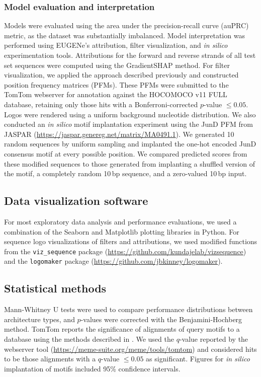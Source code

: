 \subsubsection{Model evaluation and interpretation}

Models were evaluated using the area under the precision-recall curve (auPRC) metric, as the dataset was substantially imbalanced. Model interpretation was performed using EUGENe’s attribution, filter visualization, and \textit{in silico} experimentation tools. Attributions for the forward and reverse strands of all test set sequences were computed using the GradientSHAP method.\cite{Lundberg2017-hh} For filter visualization, we applied the approach described previously and constructed position frequency matrices (PFMs). These PFMs were submitted to the TomTom webserver for annotation against the HOCOMOCO v11 FULL database,\cite{Kulakovskiy2018-oz} retaining only those hits with a Bonferroni-corrected $p$-value $\leq 0.05$. Logos were rendered using a uniform background nucleotide distribution. We also conducted an \textit{in silico} motif implantation experiment using the JunD PFM from JASPAR (\url{https://jaspar.genereg.net/matrix/MA0491.1}). We generated 10 random sequences by uniform sampling and implanted the one-hot encoded JunD consensus motif at every possible position. We compared predicted scores from these modified sequences to those generated from implanting a shuffled version of the motif, a completely random 10\,bp sequence, and a zero-valued 10\,bp input.

\subsection{Data visualization software}

For most exploratory data analysis and performance evaluations, we used a combination of the Seaborn and Matplotlib plotting libraries in Python. For sequence logo visualizations of filters and attributions, we used modified functions from the \texttt{viz\_sequence} package (\url{https://github.com/kundajelab/vizsequence}) and the \texttt{logomaker} package (\url{https://github.com/jbkinney/logomaker}).

\subsection{Statistical methods}

Mann-Whitney U tests\cite{Mann1947-dw} were used to compare performance distributions between architecture types, and $p$-values were corrected with the Benjamini-Hochberg method\cite{Benjamini1995-da}. TomTom reports the significance of alignments of query motifs to a database using the methods described in \cite{Gupta2007-zw}. We used the $q$-value reported by the webserver tool (\url{https://meme-suite.org/meme/tools/tomtom}) and considered hits to be those alignments with a $q$-value $\leq 0.05$ as significant. Figures for \textit{in silico} implantation of motifs included 95\% confidence intervals.


